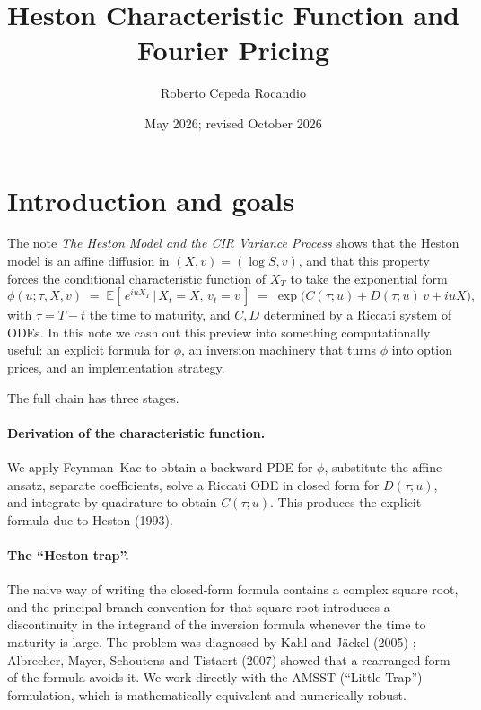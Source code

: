 \documentclass[11pt]{article}
\title{Heston Characteristic Function and Fourier Pricing}
\author{Roberto Cepeda Rocandio}
\date{May 2026; revised October 2026}
\theoremstyle{plain}
\theoremstyle{definition}
\theoremstyle{remark}
\begin{document}
\maketitle
\tableofcontents
\bigskip

\section{Introduction and goals}

The note \emph{The Heston Model and the CIR Variance Process} shows that the Heston model is an affine diffusion in \((X, v) = (\log S, v)\), and that this property forces the conditional characteristic function of \(X_T\) to take the exponential form
\[
    \phi(u; \tau, X, v) \;=\; \mathbb{E}\!\left[\,e^{i u X_T}\,\big|\,X_t = X,\,v_t = v\,\right] \;=\; \exp\!\bigl(C(\tau; u) + D(\tau; u)\,v + i u X\bigr),
\]
with \(\tau = T - t\) the time to maturity, and \(C, D\) determined by a Riccati system of ODEs. In this note we cash out this preview into something computationally useful: an explicit formula for \(\phi\), an inversion machinery that turns \(\phi\) into option prices, and an implementation strategy.

The full chain has three stages.

\paragraph{Derivation of the characteristic function.} We apply Feynman--Kac to obtain a backward PDE for \(\phi\), substitute the affine ansatz, separate coefficients, solve a Riccati ODE in closed form for \(D(\tau; u)\), and integrate by quadrature to obtain \(C(\tau; u)\). This produces the explicit formula due to Heston (1993).

\paragraph{The ``Heston trap''.} The naive way of writing the closed-form formula contains a complex square root, and the principal-branch convention for that square root introduces a discontinuity in the integrand of the inversion formula whenever the time to maturity is large. The problem was diagnosed by Kahl and J\"ackel (2005) \cite{KahlJaeckel2005}; Albrecher, Mayer, Schoutens and Tistaert (2007) \cite{AMSS2007} showed that a rearranged form of the formula avoids it. We work directly with the AMSST (``Little Trap'') formulation, which is mathematically equivalent and numerically robust.
\end{document}
